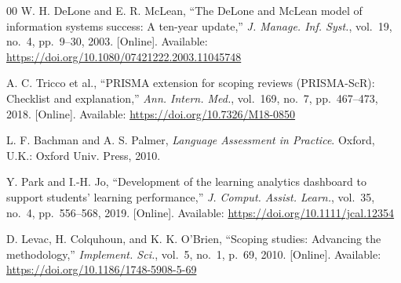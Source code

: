 \documentclass[conference]{IEEEtran}
\begin{document}
\begin{thebibliography}{00}
W. H. DeLone and E. R. McLean, ``The DeLone and McLean model of
information systems success: A ten-year update,'' \textit{J. Manage.
Inf. Syst.}, vol.~19, no.~4, pp.~9--30, 2003. [Online]. Available:
\url{https://doi.org/10.1080/07421222.2003.11045748}

A. C. Tricco et al., ``PRISMA extension for scoping reviews (PRISMA-ScR):
Checklist and explanation,'' \textit{Ann. Intern. Med.}, vol.~169,
no.~7, pp.~467--473, 2018. [Online]. Available:
\url{https://doi.org/10.7326/M18-0850}

L. F. Bachman and A. S. Palmer, \textit{Language Assessment in
Practice}. Oxford, U.K.: Oxford Univ. Press, 2010.

Y. Park and I.-H. Jo, ``Development of the learning analytics dashboard
to support students' learning performance,'' \textit{J. Comput. Assist.
Learn.}, vol.~35, no.~4, pp.~556--568, 2019. [Online]. Available:
\url{https://doi.org/10.1111/jcal.12354}

D. Levac, H. Colquhoun, and K. K. O'Brien, ``Scoping studies: Advancing
the methodology,'' \textit{Implement. Sci.}, vol.~5, no.~1, p.~69,
2010. [Online]. Available:
\url{https://doi.org/10.1186/1748-5908-5-69}

\end{thebibliography}
\end{document}
